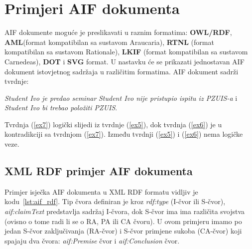 \section{Primjeri AIF dokumenta}
\label{sec:primjeri}

AIF dokumente moguće je preslikavati u raznim formatima: 
\textbf{OWL/RDF}, \textbf{AML}(format kompatibilan sa sustavom Araucaria), 
\textbf{RTNL} (format kompatibilan sa sustavom Rationale), 
\textbf{LKIF} (format kompatibilan sa sustavom Carnedeas), \textbf{DOT}  i \textbf{SVG}  format. 
U nastavku će se prikazati jednostavan AIF dokument istovjetnog sadržaja 
u različitim formatima. AIF dokument sadrži tvrdnje: 
\begin{exe}
    \ex\label{ex5} \emph{Student Ivo je predao seminar}
    \ex\label{ex6} \emph{Student Ivo nije pristupio ispitu iz PZUIS-a} i
    \ex\label{ex7} \emph{Student Ivo bi trebao položiti PZUIS}.
\end{exe}
Tvrdnja (\ref{ex7}) logički slijedi iz tvrdnje (\ref{ex5}), dok tvrdnja (\ref{ex6})
je u kontradikciji sa tvrdnjom (\ref{ex7}). Između tvrdnji (\ref{ex5}) i (\ref{ex6}) 
nema logičke veze. 

\subsection{XML RDF primjer AIF dokumenta}

Primjer isječka AIF dokumenta u XML RDF formatu vidljiv je kodu~\ref{lst:aif_rdf}.
Tip čvora definiran je kroz \textit{rdf:type} (I-čvor ili S-čvor),
\textit{aif:claimText} predstavlja sadržaj I-čvora, dok S-čvor ima ima različita
svojstva (ovisno o tome radi li se o RA, PA ili CA čvoru). 
U ovom primjeru imamo po jedan S-čvor zaključivanja (RA-čvor) 
i S-čvor primjene sukoba (CA-čvor) koji 
spajaju dva čvora: \textit{aif:Premise} čvor i \textit{aif:Conclusion} čvor. 

